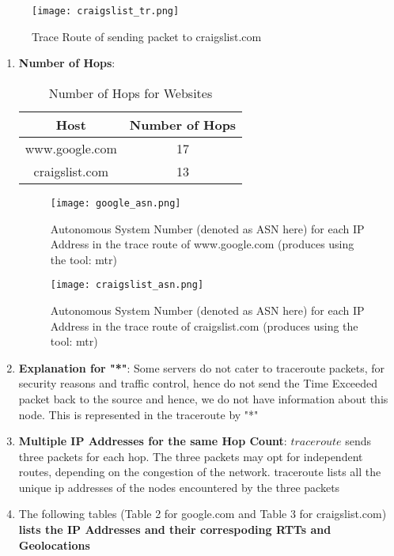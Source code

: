 \documentclass[12pt]{article}
\begin{document}
\begin{figure}[h!]
    \centering
    \texttt{[image: craigslist\_tr.png]}
    \caption{Trace Route of sending packet to craigslist.com}
\end{figure}
\renewcommand{\labelenumi}{\Alph{enumi}}
\begin{enumerate}
    \item \textbf{Number of Hops}:
    \begin{table}[h!]
        \centering
        \caption{Number of Hops for Websites}
        \begin{tabular}{|c|c|}
            \hline
            Host & Number of Hops \\
            \hline
            www.google.com & 17 \\
            craigslist.com & 13 \\
            \hline
        \end{tabular}
    \end{table}
    \begin{figure}[h!]
        \centering
        \texttt{[image: google\_asn.png]}
        \caption{Autonomous System Number (denoted as ASN here) for each IP Address in the trace route of www.google.com (produces using the tool: mtr)}
    \end{figure}
    \begin{figure}[h!]
        \centering
        \texttt{[image: craigslist\_asn.png]}
        \caption{Autonomous System Number (denoted as ASN here) for each IP Address in the trace route of craigslist.com (produces using the tool: mtr)}
    \end{figure}
    \item \textbf{Explanation for "*"}: Some servers do not cater to traceroute packets, for security reasons and traffic control, hence do not send the Time Exceeded packet back to the source and hence, we do not have information about this node. This is represented in the traceroute by "*"
    \item \textbf{Multiple IP Addresses for the same Hop Count}: $traceroute$ sends three packets for each hop. The three packets may opt for independent routes, depending on the congestion of the network. traceroute lists all the unique ip addresses of the nodes encountered by the three packets
    \item The following tables (Table 2 for google.com and Table 3 for craigslist.com) \textbf{lists the IP Addresses and their correspoding RTTs and Geolocations}

\end{enumerate}
\end{document}
